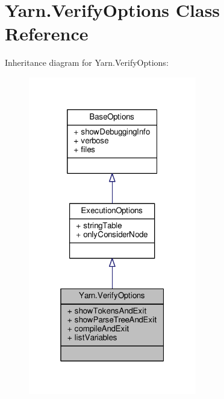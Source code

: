\hypertarget{a00171}{\section{Yarn.\-Verify\-Options Class Reference}
\label{a00171}
}


Inheritance diagram for Yarn.\-Verify\-Options\-:
\nopagebreak
\begin{figure}[H]
\begin{center}
\leavevmode
\includegraphics[width=208pt]{a00651}
\end{center}
\end{figure}


